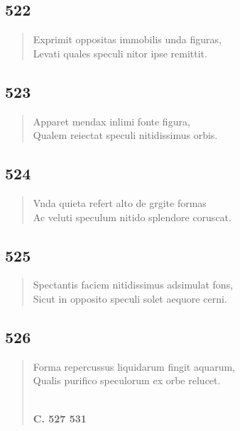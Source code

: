 \documentclass[11pt, a4paper]{report}
\begin{document}
            \subsection*{522}
      \begin{verse}
      Exprimit oppositas immobilis unda figuras, \\ Levati quales speculi nitor ipse remittit. \\ 
      \end{verse}
  
            \subsection*{523}
      \begin{verse}
      Apparet mendax inlimi fonte figura, \\ Qualem reiectat speculi nitidissimus orbis. \\ 
      \end{verse}
  
            \subsection*{524}
      \begin{verse}
      Vnda quieta refert alto de grgite formas \\ Ac veluti speculum nitido splendore coruscat. \\ 
      \end{verse}
  
            \subsection*{525}
      \begin{verse}
      Spectantis faciem nitidissimus adsimulat fons, \\ Sicut in opposito speculi solet aequore cerni. \\ 
      \end{verse}
  
            \subsection*{526}
      \begin{verse}
      Forma repercussus liquidarum fingit aquarum, \\ Qualis purifico speculorum ex orbe relucet. \\ 
        ﻿\pagebreak 
    \begin{center} \textbf{C. 527 531} \end{center} \marginpar{[66]} 
      \end{verse}
  
\end{document}
